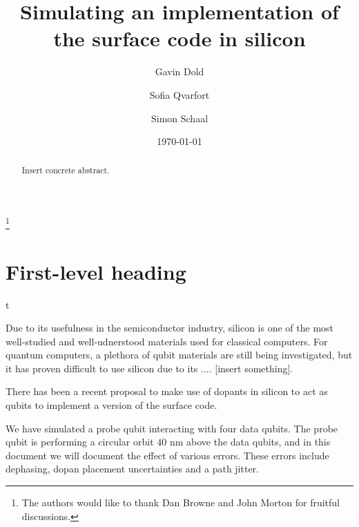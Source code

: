 \documentclass[%
 reprint,
 amsmath,amssymb,
 aps,
]{revtex4-1}
\begin{document}

\title{Simulating an implementation of the surface code in silicon }%
\thanks{The authors would like to thank Dan Browne and John Morton for fruitful discussions. }%

\author{Gavin Dold}
\author{Sofia Qvarfort}
 
\author{Simon Schaal}



\date{\today}%

\begin{abstract}
Insert concrete abstract. 
\end{abstract}

\maketitle


\section{\label{sec:level1}First-level heading}

t





Due to its usefulness in the semiconductor industry, silicon is one of the most well-studied and well-udnerstood materials used for classical computers. For quantum computers, a plethora of qubit materials are still being investigated, but it has proven difficult to use silicon due to its .... [insert something]. 

There has been a recent proposal to make use of dopants in silicon to act as qubits \cite{the paper} to implement a version of the surface code. 


We have simulated a probe qubit interacting with four data qubits. The probe qubit is performing a circular orbit $40$ nm above the data qubits, and in this document we will document the effect of various errors. These errors include dephasing, dopan placement uncertainties and a path jitter. 
\end{document}
